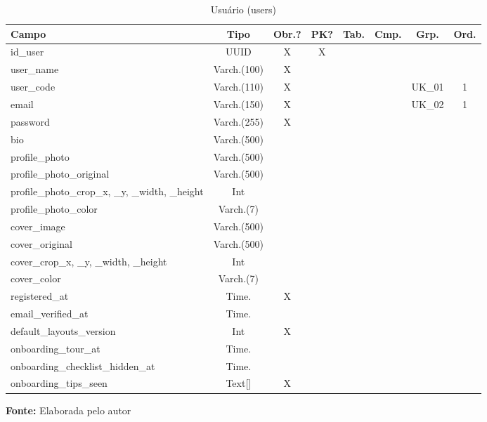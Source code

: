 \FloatBarrier
\begin{table}[!htbp]
    \centering
    \caption{Usuário (users)}
    \label{tab:tabelaUserDetalhado}
    \footnotesize
    \begin{tabularx}{\textwidth}{|X|c|c|c|c|c|c|c|}
        \hline
        \textbf{Campo} & \textbf{Tipo} & \textbf{Obr.?} & \textbf{PK?} & \textbf{Tab.} & \textbf{Cmp.} & \textbf{Grp.} & \textbf{Ord.} \\ \hline
        id\_user & UUID & X & X & & & & \\ \hline
        user\_name & Varch.(100) & X & & & & & \\ \hline
        user\_code & Varch.(110) & X & & & & UK\_01 & 1 \\ \hline
        email & Varch.(150) & X & & & & UK\_02 & 1 \\ \hline
        password & Varch.(255) & X & & & & & \\ \hline
        bio & Varch.(500) & & & & & & \\ \hline
        profile\_photo & Varch.(500) & & & & & & \\ \hline
        profile\_photo\_original & Varch.(500) & & & & & & \\ \hline
        profile\_photo\_crop\_x, \_y, \_width, \_height & Int & & & & & & \\ \hline
        profile\_photo\_color & Varch.(7) & & & & & & \\ \hline
        cover\_image & Varch.(500) & & & & & & \\ \hline
        cover\_original & Varch.(500) & & & & & & \\ \hline
        cover\_crop\_x, \_y, \_width, \_height & Int & & & & & & \\ \hline
        cover\_color & Varch.(7) & & & & & & \\ \hline
        registered\_at & Time. & X & & & & & \\ \hline
        email\_verified\_at & Time. & & & & & & \\ \hline
        default\_layouts\_version & Int & X & & & & & \\ \hline
        onboarding\_tour\_at & Time. & & & & & & \\ \hline
        onboarding\_checklist\_hidden\_at & Time. & & & & & & \\ \hline
        onboarding\_tips\_seen & Text[] & X & & & & & \\ \hline
    \end{tabularx}

    \vspace{0.2cm}
    {\footnotesize \textbf{Fonte:} Elaborada pelo autor}
\end{table}

